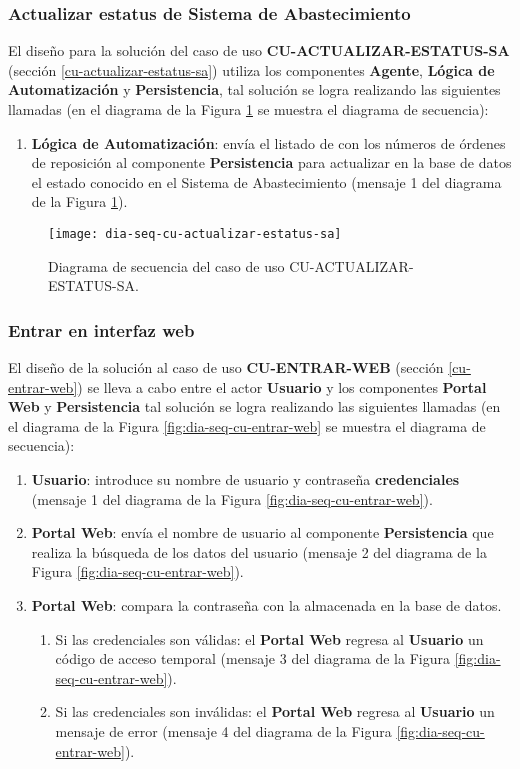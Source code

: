 \subsubsection{Actualizar estatus de Sistema de Abastecimiento}
El diseño para la solución del caso de uso \textbf{CU-ACTUALIZAR-ESTATUS-SA} (sección \ref{cu-actualizar-estatus-sa}) utiliza los componentes \textbf{Agente}, \textbf{Lógica de Automatización} y \textbf{Persistencia}, tal solución se logra realizando las siguientes llamadas (en el diagrama de la Figura \ref{fig:dia-seq-cu-actualizar-estatus-sa} se muestra el diagrama de secuencia):
\begin{enumerate}
	\item \textbf{Lógica de Automatización}: envía el listado de con los números de órdenes de reposición al componente \textbf{Persistencia} para actualizar en la base de datos el estado conocido en el Sistema de Abastecimiento (mensaje 1 del diagrama de la Figura \ref{fig:dia-seq-cu-actualizar-estatus-sa}).
\end{enumerate}

\begin{figure}[h]
	\centering
	\texttt{[image: dia-seq-cu-actualizar-estatus-sa]}
	\caption{Diagrama de secuencia del caso de uso CU-ACTUALIZAR-ESTATUS-SA.}
	\label{fig:dia-seq-cu-actualizar-estatus-sa}
\end{figure}

\subsubsection{Entrar en interfaz web}
El diseño de la solución al caso de uso \textbf{CU-ENTRAR-WEB} (sección \ref{cu-entrar-web}) se lleva a cabo entre el actor \textbf{Usuario} y los componentes \textbf{Portal Web} y \textbf{Persistencia} tal solución se logra realizando las siguientes llamadas (en el diagrama de la Figura \ref{fig:dia-seq-cu-entrar-web} se muestra el diagrama de secuencia):
\begin{enumerate}
	\item \textbf{Usuario}: introduce su nombre de usuario y contraseña \textbf{credenciales} (mensaje 1 del diagrama de la Figura \ref{fig:dia-seq-cu-entrar-web}).
	\item \textbf{Portal Web}: envía el nombre de usuario al componente \textbf{Persistencia} que realiza la búsqueda de los datos del usuario (mensaje 2 del diagrama de la Figura \ref{fig:dia-seq-cu-entrar-web}).
	\item \textbf{Portal Web}: compara la contraseña con la almacenada en la base de datos.
	\begin{enumerate}
		\item Si las credenciales son válidas: el \textbf{Portal Web} regresa al \textbf{Usuario} un código de acceso temporal (mensaje 3 del diagrama de la Figura \ref{fig:dia-seq-cu-entrar-web}).
		\item Si las credenciales son inválidas: el \textbf{Portal Web} regresa al \textbf{Usuario} un mensaje de error (mensaje 4 del diagrama de la Figura \ref{fig:dia-seq-cu-entrar-web}).
	\end{enumerate}
\end{enumerate}

